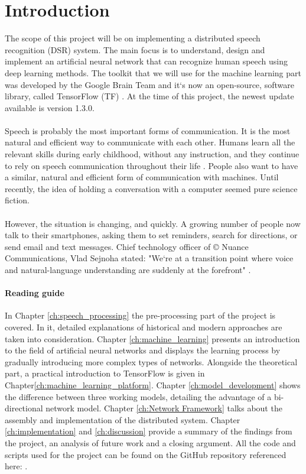 \chapter{Introduction}\label{ch:introduction}
The scope of this project will be on implementing a distributed speech recognition (DSR) system.
The main focus is to understand, design and implement an artificial neural network that can recognize human speech using deep learning methods.
The toolkit that we will use for the machine learning part was developed by the Google Brain Team and it`s now an open-source, software library, called TensorFlow (TF) \cite{tensorflow2015-whitepaper}.
At the time of this project, the newest update available is version 1.3.0.\\\\
Speech is probably the most important forms of communication.
It is the most natural and efficient way to communicate with
each other. Humans learn all the relevant skills during early
childhood, without any instruction, and they continue to rely
on speech communication throughout their life \cite{kamblespeech}.
People also want to have a similar, natural and efficient form of communication with machines. 
Until recently, the idea of holding a conversation with a computer seemed pure science fiction.\\\\
However, the situation is changing, and quickly.
A growing number of people now talk to their smartphones, asking them to set reminders, search for directions, or send email and text messages.
Chief technology officer of \copyright{} Nuance Communications, Vlad Sejnoha stated: "We`re at a transition point where voice and natural-language understanding are suddenly at the forefront" \cite{kamblespeech}.
\subsubsection{Reading guide}
In Chapter \ref{ch:speech_processing} the pre-processing part of the project is covered. In it, detailed explanations of historical and modern approaches are taken into consideration. Chapter \ref{ch:machine_learning} presents an introduction to the field of artificial neural networks and displays the learning process by gradually introducing more complex types of networks. Alongside the theoretical part, a practical introduction to TensorFlow is given in Chapter\ref{ch:machine_learning_platform}. Chapter \ref{ch:model_development} shows the difference between three working models, detailing the advantage of a bi-directional network model. Chapter \ref{ch:Network Framework} talks about the assembly and implementation of the distributed system. Chapter \ref{ch:implementation} and \ref{ch:discussion} provide a summary of the findings from the project, an analysis of future work and a closing argument. All the code and scripts used for the project can be found on the GitHub repository referenced here: \cite{mavericks2017}.